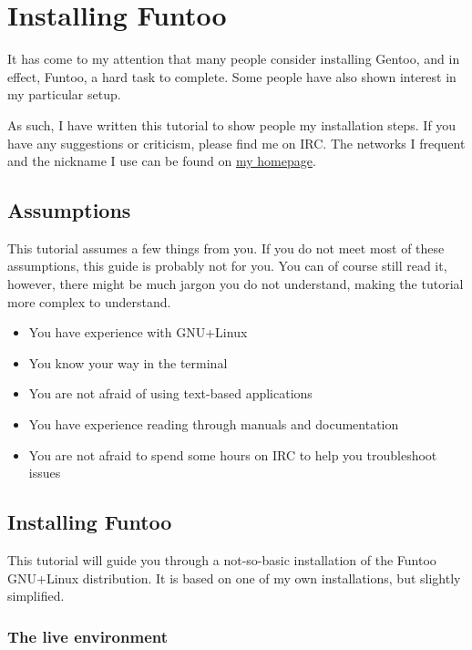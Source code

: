 

\section{Installing Funtoo}\label{installing-funtoo}

It has come to my attention that many people consider installing Gentoo,
and in effect, Funtoo, a hard task to complete. Some people have also
shown interest in my particular setup.

As such, I have written this tutorial to show people my installation
steps. If you have any suggestions or criticism, please find me on IRC.
The networks I frequent and the nickname I use can be found on
\href{http://tyil.work}{my homepage}.

\subsection{Assumptions}\label{assumptions}

This tutorial assumes a few things from you. If you do not meet most of
these assumptions, this guide is probably not for you. You can of course
still read it, however, there might be much jargon you do not
understand, making the tutorial more complex to understand.

\begin{itemize}
\tightlist
\item
  You have experience with GNU+Linux
\item
  You know your way in the terminal
\item
  You are not afraid of using text-based applications
\item
  You have experience reading through manuals and documentation
\item
  You are not afraid to spend some hours on IRC to help you troubleshoot
  issues
\end{itemize}

\subsection{Installing Funtoo}\label{installing-funtoo-1}

This tutorial will guide you through a not-so-basic installation of the
Funtoo GNU+Linux distribution. It is based on one of my own
installations, but slightly simplified.

\subsubsection{The live environment}\label{the-live-environment}

